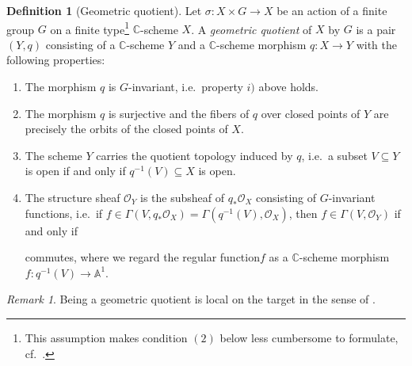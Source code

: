 \documentclass[12pt,a4paper]{amsart}
\theoremstyle{plain}
\theoremstyle{definition}
\newtheorem{defn}[thm]{Definition}
\theoremstyle{remark}
\newtheorem{rem}[thm]{Remark}
\begin{document}
\begin{defn}[Geometric quotient]
  Let $\sigma \colon X \times G \to X$ be an action of a finite group $G$ on a finite type\footnote{This assumption makes condition $(2)$ below less cumbersome to formulate, cf.~\cite[Definition 0.6]{mfk94}.} $\mathbb{C}$-scheme $X$.
  A \textit{geometric quotient} of $X$ by $G$ is a pair $(Y, q)$ consisting of a $\mathbb{C}$-scheme $Y$ and a $\mathbb{C}$-scheme morphism $q \colon X \to Y$ with the following properties:
  \begin{enumerate}
    \item The morphism $q$ is $G$-invariant, i.e.~property $i)$ above holds.
    \item The morphism $q$ is surjective and the fibers of $q$ over closed points of $Y$ are precisely the orbits of the closed points of $X$.
    \item The scheme $Y$ carries the quotient topology induced by $q$, i.e.~a subset $V \subseteq Y$ is open if and only if $q^{-1}(V) \subseteq X$ is open.
    \item The structure sheaf $\mathscr{O}_{Y}$ is the subsheaf of $q_{*}\mathscr{O}_{X}$ consisting of $G$-invariant functions, i.e.~if $f \in \Gamma(V, q_{*}\mathscr{O}_{X}) = \Gamma(q^{-1}(V),\mathscr{O}_{X})$, then $f \in \Gamma(V, \mathscr{O}_{Y})$ if and only if

      \begin{center}
      \end{center}
      commutes, where we regard the regular function$f$ as a $\mathbb{C}$-scheme morphism $f \colon q^{-1}(V) \to \mathbb{A}^{1}$.
    \end{enumerate}
\end{defn}

\begin{rem}\label{rem:loct}
  Being a geometric quotient is local on the target in the sense of \cite[Appendix C]{gw10}.
\end{rem}
\end{document}
